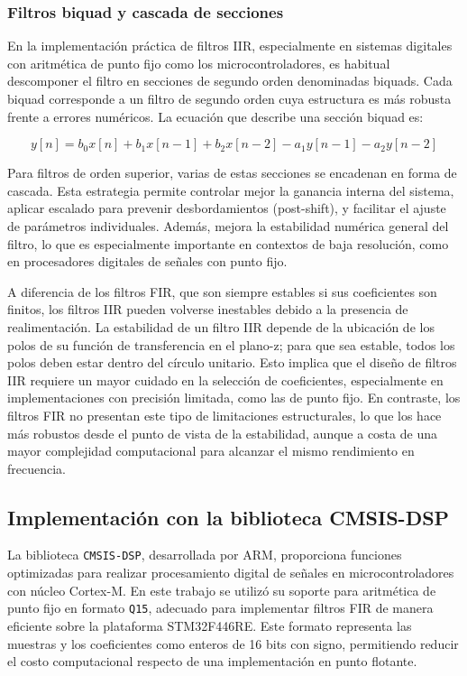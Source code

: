 \documentclass[12pt]{article}
\begin{document}
	\subsubsection{Filtros biquad y cascada de secciones}
	En la implementación práctica de filtros IIR, especialmente en sistemas digitales con aritmética de punto fijo como los microcontroladores, es habitual descomponer el filtro en secciones de segundo orden denominadas biquads. Cada biquad corresponde a un filtro de segundo orden cuya estructura es más robusta frente a errores numéricos. La ecuación que describe una sección biquad es:
	
	\begin{equation}
		y[n] = b_0 x[n] + b_1 x[n-1] + b_2 x[n-2] - a_1 y[n-1] - a_2 y[n-2]
	\end{equation}
	
	Para filtros de orden superior, varias de estas secciones se encadenan en forma de cascada. Esta estrategia permite controlar mejor la ganancia interna del sistema, aplicar escalado para prevenir desbordamientos (post-shift), y facilitar el ajuste de parámetros individuales. Además, mejora la estabilidad numérica general del filtro, lo que es especialmente importante en contextos de baja resolución, como en procesadores digitales de señales con punto fijo.\newpage
	
	A diferencia de los filtros FIR, que son siempre estables si sus coeficientes son finitos, los filtros IIR pueden volverse inestables debido a la presencia de realimentación. La estabilidad de un filtro IIR depende de la ubicación de los polos de su función de transferencia en el plano-z; para que sea estable, todos los polos deben estar dentro del círculo unitario. Esto implica que el diseño de filtros IIR requiere un mayor cuidado en la selección de coeficientes, especialmente en implementaciones con precisión limitada, como las de punto fijo. En contraste, los filtros FIR no presentan este tipo de limitaciones estructurales, lo que los hace más robustos desde el punto de vista de la estabilidad, aunque a costa de una mayor complejidad computacional para alcanzar el mismo rendimiento en frecuencia.
	
	\subsection{Implementación con la biblioteca CMSIS-DSP}
	
	La biblioteca \texttt{CMSIS-DSP}, desarrollada por ARM, proporciona funciones optimizadas para realizar procesamiento digital de señales en microcontroladores con núcleo Cortex-M. En este trabajo se utilizó su soporte para aritmética de punto fijo en formato \texttt{Q15}, adecuado para implementar filtros FIR de manera eficiente sobre la plataforma STM32F446RE. Este formato representa las muestras y los coeficientes como enteros de 16 bits con signo, permitiendo reducir el costo computacional respecto de una implementación en punto flotante.
	
\end{document}
